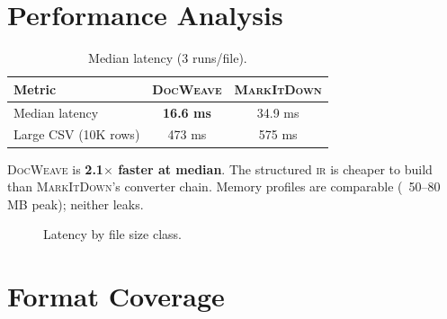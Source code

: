 \documentclass[10pt, conference, compsocconf]{IEEEtran}
\theoremstyle{plain}
\newcommand{\docweave}{\textsc{DocWeave}}
\newcommand{\markitdown}{\textsc{MarkItDown}}
\newcommand{\ir}{\textsc{ir}}
\begin{document}
\section{Performance Analysis}
\label{sec:performance}

\begin{table}[H]
\centering
\caption{Median latency (3 runs/file).}
\label{tab:latency}
\begin{tabular}{@{}lcc@{}}
\toprule
\textbf{Metric} & \textbf{\docweave{}} & \textbf{\markitdown{}} \\
\midrule
Median latency & \textbf{16.6 ms} & 34.9 ms \\
Large CSV (10K rows) & 473 ms & 575 ms \\
\bottomrule
\end{tabular}
\end{table}

\docweave{} is \textbf{2.1$\times$ faster at median}. The structured \ir{} is cheaper to build than \markitdown{}'s converter chain. Memory profiles are comparable (~50--80 MB peak); neither leaks.

\begin{figure}[H]
\centering
{}
\caption{Latency by file size class.}
\label{fig:latency}
\end{figure}

\section{Format Coverage}
\label{sec:formats}
\end{document}
